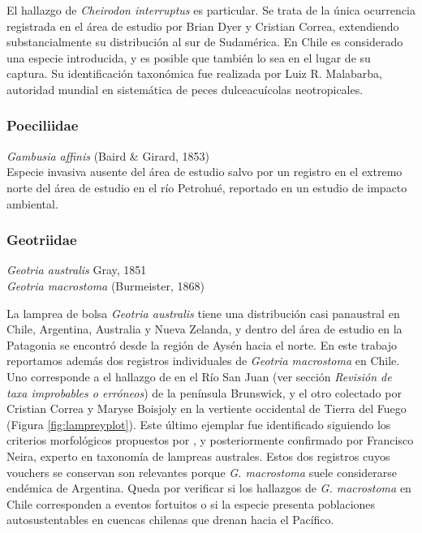 \documentclass[sn-apa,pdflatex]{sn-jnl}
\begin{document}
El hallazgo de \emph{Cheirodon interruptus} es particular. Se trata de
la única ocurrencia registrada en el área de estudio por Brian Dyer y
Cristian Correa, extendiendo substancialmente su distribución al sur de
Sudamérica. En Chile es considerado una especie introducida, y es
posible que también lo sea en el lugar de su captura. Su identificación
taxonómica fue realizada por Luiz R. Malabarba, autoridad mundial en
sistemática de peces dulceacuícolas neotropicales.

\subsubsection{Poeciliidae}\label{poeciliidae}

\emph{Gambusia affinis} (Baird \& Girard, 1853)\\
Especie invasiva ausente del área de estudio salvo por un registro en el
extremo norte del área de estudio en el río Petrohué, reportado en un
estudio de impacto ambiental.

\subsubsection{Geotriidae}\label{geotriidae}

\emph{Geotria australis} Gray, 1851\\
\emph{Geotria macrostoma} (Burmeister, 1868)

La lamprea de bolsa \emph{Geotria australis} tiene una distribución casi
panaustral en Chile, Argentina, Australia y Nueva Zelanda, y dentro del
área de estudio en la Patagonia se encontró desde la región de Aysén
hacia el norte. En este trabajo reportamos además dos registros
individuales de \emph{Geotria macrostoma} en Chile. Uno corresponde a el
hallazgo de \citet{Sieldfeld1976} en el Río San Juan (ver sección
\emph{Revisión de taxa improbables o erróneos}) de la península
Brunswick, y el otro colectado por Cristian Correa y Maryse Boisjoly en
la vertiente occidental de Tierra del Fuego (Figura
\ref{fig:lampreyplot}). Este último ejemplar fue identificado siguiendo
los criterios morfológicos propuestos por \citet{Riva-Rossi2020}, y
posteriormente confirmado por Francisco Neira, experto en taxonomía de
lampreas australes. Estos dos registros cuyos vouchers se conservan son
relevantes porque \emph{G. macrostoma} suele considerarse endémica de
Argentina. Queda por verificar si los hallazgos de \emph{G. macrostoma}
en Chile corresponden a eventos fortuitos o si la especie presenta
poblaciones autosustentables en cuencas chilenas que drenan hacia el
Pacífico.
\end{document}
